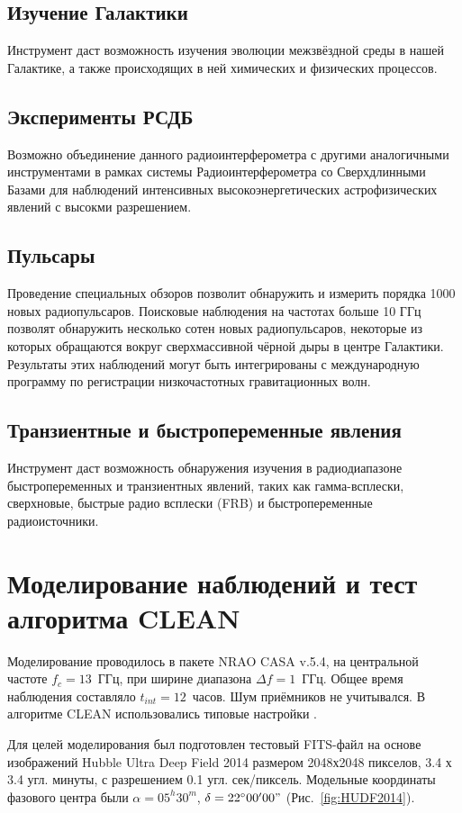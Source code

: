 \documentclass[10pt,a4paper]{article}
\begin{document}
\subsection{Изучение Галактики}
Инструмент даст возможность изучения эволюции межзвёздной среды в нашей Галактике, а также происходящих в ней химических и физических процессов.

\subsection{Эксперименты РСДБ}
Возможно объединение данного радиоинтерферометра с другими аналогичными инструментами в рамках системы Радиоинтерферометра со Сверхдлинными Базами для наблюдений интенсивных высокоэнергетических астрофизических явлений с высокми разрешением.

\subsection{Пульсары}
Проведение специальных обзоров позволит обнаружить и измерить порядка 1000 новых радиопульсаров. Поисковые наблюдения на частотах больше 10 ГГц позволят обнаружить несколько сотен новых радиопульсаров, некоторые из которых обращаются вокруг сверхмассивной чёрной дыры в центре Галактики. Результаты этих наблюдений могут быть интегрированы с международную программу по регистрации низкочастотных гравитационных волн.

\subsection{Транзиентные и быстропеременные явления}
Инструмент даст возможность обнаружения изучения в радиодиапазоне быстропеременных и транзиентных явлений, таких как гамма-всплески, сверхновые, быстрые радио всплески (FRB) и быстропеременные радиоисточники.

\section{Моделирование наблюдений и тест алгоритма CLEAN}
Моделирование проводилось в пакете NRAO CASA v.5.4, на центральной частоте $f_c=13$~ГГц, 
при ширине диапазона $\Delta f=1$~ГГц. Общее время наблюдения составляло $t_{int}=12$~часов. Шум приёмников 
не учитывался. В алгоритме CLEAN использовались типовые настройки \cite{CASA_settings}.

Для целей моделирования был подготовлен тестовый FITS-файл на основе изображений Hubble Ultra Deep Field 2014 \cite{HUDF2014} размером 
2048х2048 пикселов, 3.4 х 3.4 угл. минуты, с разрешением 0.1 угл. сек/пиксель. Модельные координаты фазового центра были $\alpha=05^h30^m$, $\delta=22^{\circ}00'00"$ (Рис.~\ref{fig:HUDF2014}).
\end{document}

